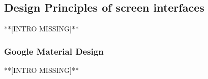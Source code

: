 \subsection{Design Principles of screen interfaces}
**[INTRO MISSING]**
\subsubsection{Google Material Design}
**[INTRO MISSING]**
